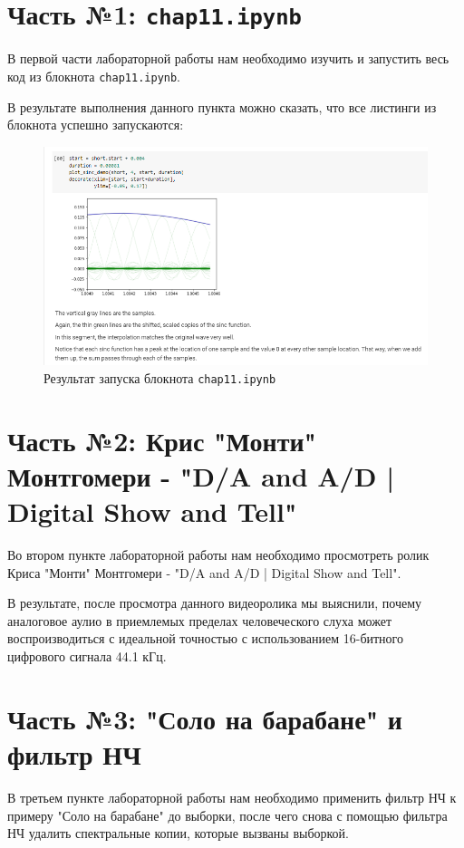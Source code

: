 \documentclass[a4paper]{article}
\begin{document}
    \newpage
        \section{Часть №1: \texttt{chap11.ipynb}}
            В первой части лабораторной работы нам необходимо изучить и запустить весь код из блокнота \texttt{chap11.ipynb}.
            
            В результате выполнения данного пункта можно сказать, что все листинги из блокнота успешно запускаются:
            
            \begin{figure}[H]
                \centering
                \includegraphics[width=\textwidth]{ex_1_1.png}
                \caption{Результат запуска блокнота \texttt{chap11.ipynb}}
                \label{fig:ex_1_1}
            \end{figure}
            
    \newpage
        \section{Часть №2: Крис "Монти" Монтгомери - "D/A and A/D | Digital Show and Tell"}
            Во втором пункте лабораторной работы нам необходимо просмотреть ролик Криса "Монти" Монтгомери - "D/A and A/D | Digital Show and Tell".
            
            В результате, после просмотра данного видеоролика мы выяснили, почему аналоговое аулио в приемлемых пределах человеческого слуха может воспроизводиться с идеальной точностью с использованием 16-битного цифрового сигнала 44.1 кГц.
            
    \newpage
        \section{Часть №3: "Соло на барабане" и фильтр НЧ}
            В третьем пункте  лабораторной работы нам необходимо применить фильтр НЧ к примеру "Соло на барабане" до выборки, после чего снова с помощью фильтра НЧ удалить спектральные копии, которые вызваны выборкой.
            
\end{document}
